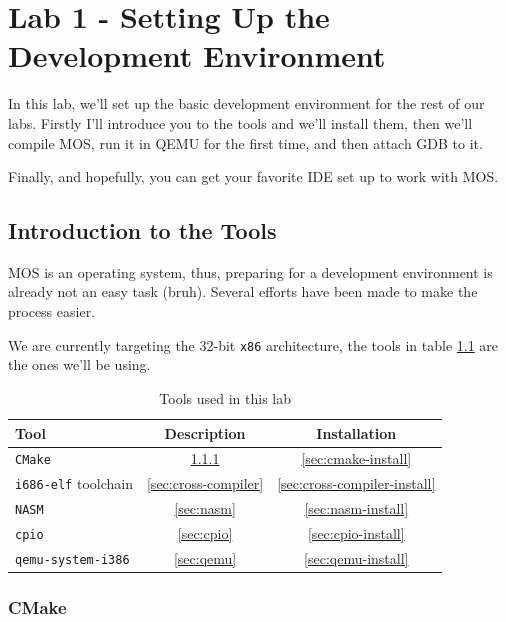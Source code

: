 \chapter{Lab 1 - Setting Up the Development Environment}

In this lab, we'll set up the basic development environment for the rest of our labs. Firstly
I'll introduce you to the tools and we'll install them, then we'll compile MOS, run it in QEMU
for the first time, and then attach GDB to it.

Finally, and hopefully, you can get your favorite IDE set up to work with MOS.

\section{Introduction to the Tools}

MOS is an operating system, thus, preparing for a development environment is already not
an easy task (bruh). Several efforts have been made to make the process easier.

We are currently targeting the 32-bit \texttt{x86} architecture, the tools in table \ref{tab:tools}
are the ones we'll be using.

\begin{table}[h!]
    \centering
    \begin{tabular}{|l|c|c|}
        \hline \textbf{Tool}               & \textbf{Description}     & \textbf{Installation}            \\
        \hline \texttt{CMake}              & \ref{sec:cmake}          & \ref{sec:cmake-install}          \\
        \hline \texttt{i686-elf} toolchain & \ref{sec:cross-compiler} & \ref{sec:cross-compiler-install} \\
        \hline \texttt{NASM}               & \ref{sec:nasm}           & \ref{sec:nasm-install}           \\
        \hline \texttt{cpio}               & \ref{sec:cpio}           & \ref{sec:cpio-install}           \\
        \hline \texttt{qemu-system-i386}   & \ref{sec:qemu}           & \ref{sec:qemu-install}           \\
        \hline
    \end{tabular}
    \caption{Tools used in this lab}
    \label{tab:tools}
\end{table}

\subsection{CMake} \label{sec:cmake}

